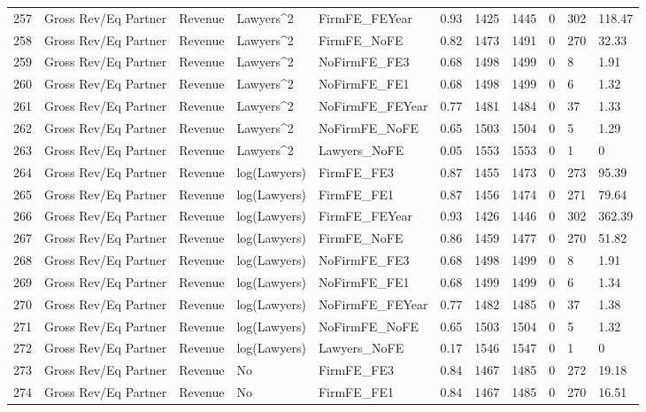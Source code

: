 \documentclass{article}
\begin{document}
\begin{table}[H]
\begin{tabular}{rllllllllll}
  257 & Gross Rev/Eq Partner & Revenue & Lawyers^2 & FirmFE\_FEYear & 0.93 & 1425 & 1445 & 0 & 302 & 118.47 \\ 
  258 & Gross Rev/Eq Partner & Revenue & Lawyers^2 & FirmFE\_NoFE & 0.82 & 1473 & 1491 & 0 & 270 & 32.33 \\ 
  259 & Gross Rev/Eq Partner & Revenue & Lawyers^2 & NoFirmFE\_FE3 & 0.68 & 1498 & 1499 & 0 & 8 & 1.91 \\ 
  260 & Gross Rev/Eq Partner & Revenue & Lawyers^2 & NoFirmFE\_FE1 & 0.68 & 1498 & 1499 & 0 & 6 & 1.32 \\ 
  261 & Gross Rev/Eq Partner & Revenue & Lawyers^2 & NoFirmFE\_FEYear & 0.77 & 1481 & 1484 & 0 & 37 & 1.33 \\ 
  262 & Gross Rev/Eq Partner & Revenue & Lawyers^2 & NoFirmFE\_NoFE & 0.65 & 1503 & 1504 & 0 & 5 & 1.29 \\ 
  263 & Gross Rev/Eq Partner & Revenue & Lawyers^2 & Lawyers\_NoFE & 0.05 & 1553 & 1553 & 0 & 1 & 0 \\ 
  264 & Gross Rev/Eq Partner & Revenue & log(Lawyers) & FirmFE\_FE3 & 0.87 & 1455 & 1473 & 0 & 273 & 95.39 \\ 
  265 & Gross Rev/Eq Partner & Revenue & log(Lawyers) & FirmFE\_FE1 & 0.87 & 1456 & 1474 & 0 & 271 & 79.64 \\ 
  266 & Gross Rev/Eq Partner & Revenue & log(Lawyers) & FirmFE\_FEYear & 0.93 & 1426 & 1446 & 0 & 302 & 362.39 \\ 
  267 & Gross Rev/Eq Partner & Revenue & log(Lawyers) & FirmFE\_NoFE & 0.86 & 1459 & 1477 & 0 & 270 & 51.82 \\ 
  268 & Gross Rev/Eq Partner & Revenue & log(Lawyers) & NoFirmFE\_FE3 & 0.68 & 1498 & 1499 & 0 & 8 & 1.91 \\ 
  269 & Gross Rev/Eq Partner & Revenue & log(Lawyers) & NoFirmFE\_FE1 & 0.68 & 1499 & 1499 & 0 & 6 & 1.34 \\ 
  270 & Gross Rev/Eq Partner & Revenue & log(Lawyers) & NoFirmFE\_FEYear & 0.77 & 1482 & 1485 & 0 & 37 & 1.38 \\ 
  271 & Gross Rev/Eq Partner & Revenue & log(Lawyers) & NoFirmFE\_NoFE & 0.65 & 1503 & 1504 & 0 & 5 & 1.32 \\ 
  272 & Gross Rev/Eq Partner & Revenue & log(Lawyers) & Lawyers\_NoFE & 0.17 & 1546 & 1547 & 0 & 1 & 0 \\ 
  273 & Gross Rev/Eq Partner & Revenue & No & FirmFE\_FE3 & 0.84 & 1467 & 1485 & 0 & 272 & 19.18 \\ 
  274 & Gross Rev/Eq Partner & Revenue & No & FirmFE\_FE1 & 0.84 & 1467 & 1485 & 0 & 270 & 16.51 \\ 

\end{tabular}
\end{table}
\end{document}
